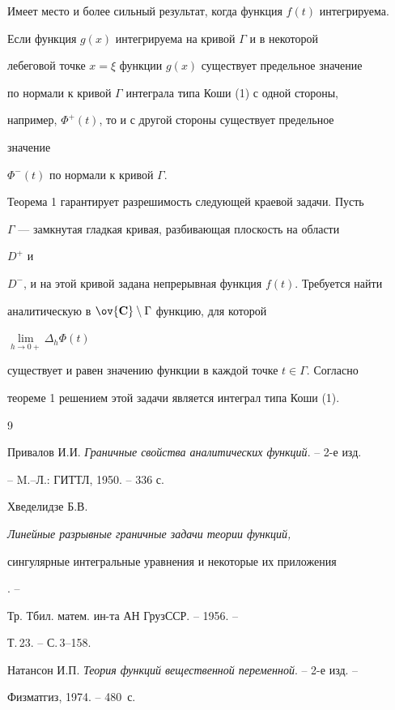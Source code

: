  


Имеет место и более сильный результат, когда функция $f(t)$ интегрируема. 


 


\begin{cor} 


Если функция $g(x)$ интегрируема на кривой $\Gamma$ и в некоторой 


лебеговой точке $x=\xi$ функции $g(x)$ существует предельное значение 


по нормали к кривой $\Gamma$ интеграла типа Коши (1) с одной стороны, 


например, $\Phi^+(t)$, то и с другой стороны существует предельное 


значение 


$\Phi^-(t)$ по нормали к кривой $\Gamma$. 


\end{cor} 


 


Теорема 1 гарантирует разрешимость следующей краевой задачи. Пусть 


$\Gamma$ --- замкнутая гладкая кривая, разбивающая плоскость на области 


$D^+$ и 


$D^-$, и на этой кривой задана непрерывная функция $f(t)$. Требуется найти 


аналитическую в $\ov{\bold C}\setminus\Gamma$ функцию, для которой 


$\lim\limits_{h\to0+}\Delta_h\Phi(t)$ 


существует и равен значению функции в каждой точке $t\in\Gamma$. Согласно 


теореме 1 решением этой задачи является интеграл типа Коши (1). 


 


 


\begin{thebibliography}{9} 


 




Привалов И.И. {\em Граничные свойства аналитических функций}. -- 2-е изд. 


-- M.--Л.: ГИТТЛ, 1950. -- 336 с. 




Хведелидзе Б.В. {\em Линейные разрывные граничные задачи теории функций, 


сингулярные интегральные уравнения и некоторые их приложения}. -- 


Тр. Тбил. матем. ин-та АН ГрузССР. -- 1956. -- 


Т.\,23. -- С.\,3--158. 




Натансон И.П. {\em Теория функций вещественной переменной}. -- 2-е изд. -- 


Физматгиз, 1974. -- 480~с. 


 


\end{thebibliography} 


